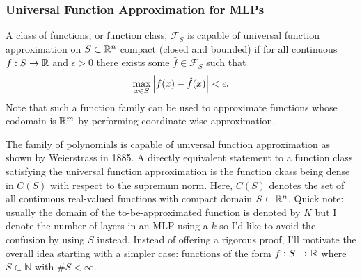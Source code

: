 \documentclass[11pt]{article}
\begin{document}
\subsubsection{Universal Function Approximation for MLPs}
\label{subsubsec:universal_function_approximation_theorem}
A class of functions, or function class, $\mathcal{F}_S$ is capable of universal function approximation on $S\subset\mathbb{R}^n$ compact (closed and bounded) if for all continuous $f:S\to\mathbb{R}$ and $\epsilon>0$ there exists some $\hat{f}\in\mathcal{F}_S$ such that
$$
\max_{x\in S}\left|f(x)-\hat{f}(x)\right|<\epsilon.
$$
Note that such a function family can be used to approximate functions whose codomain is $\mathbb{R}^m$ by performing coordinate-wise approximation. 

The family of polynomials is capable of universal function approximation as shown by Weierstrass in 1885. A directly equivalent statement to a function class satisfying the universal function approximation is the function ckass being dense in $C(S)$ with respect to the supremum norm. Here, $C(S)$ denotes the set of all continuous real-valued functions with compact domain $S\subset\mathbb{R}^n$. Quick note: usually the domain of the to-be-approximated function is denoted by $K$ but I denote the number of layers in an MLP using a $k$ so I'd like to avoid the confusion by using $S$ instead. Instead of offering a rigorous proof, I'll motivate the overall idea starting with a simpler case: functions of the form $f:S\to\mathbb{R}$ where $S\subset\mathbb{N}$ with $\#S<\infty$.
\end{document}
